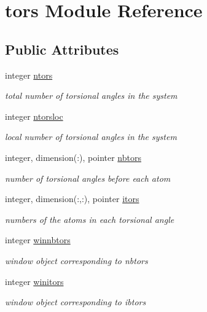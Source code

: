 \hypertarget{classtors}{\section{tors Module Reference}
\label{classtors}
}
\subsection*{Public Attributes}
\begin{DoxyCompactItemize}
\item 
integer \hyperlink{classtors_aa883bf512b1cd4a01eb09910fc3c72cc}{ntors}
\begin{DoxyCompactList}\small\item\em total number of torsional angles in the system \end{DoxyCompactList}\item 
integer \hyperlink{classtors_a83adafb5bf95a63da4cb0fa82209eb42}{ntorsloc}
\begin{DoxyCompactList}\small\item\em local number of torsional angles in the system \end{DoxyCompactList}\item 
integer, dimension(\-:), pointer \hyperlink{classtors_ae485dde8e89b669d1fdb5c91c0ae4777}{nbtors}
\begin{DoxyCompactList}\small\item\em number of torsional angles before each atom \end{DoxyCompactList}\item 
integer, dimension(\-:,\-:), pointer \hyperlink{classtors_a603c1a2d6e0a48c34c461c682ccbf2b4}{itors}
\begin{DoxyCompactList}\small\item\em numbers of the atoms in each torsional angle \end{DoxyCompactList}\item 
integer \hyperlink{classtors_a556d53e79c9d029d13359b1e5059c3f1}{winnbtors}
\begin{DoxyCompactList}\small\item\em window object corresponding to nbtors \end{DoxyCompactList}\item 
integer \hyperlink{classtors_a4dd43f0fddaea87e391cb9579dc3c474}{winitors}
\begin{DoxyCompactList}\small\item\em window object corresponding to ibtors \end{DoxyCompactList}\item 

\end{DoxyCompactItemize}
